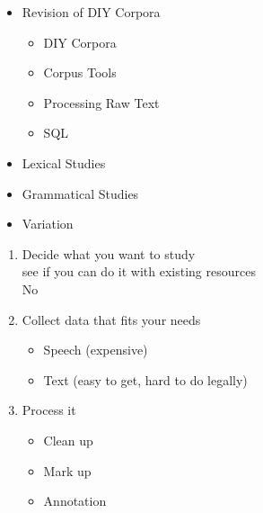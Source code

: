 \documentclass[a4paper,landscape,headrule,footrule,dvips]{foils}
\begin{document}
\begin{CJK}{UTF8}{min}

\maketitle



\begin{itemize} 
\item Revision  of DIY Corpora
  \begin{itemize} 
  \item DIY Corpora
  \item Corpus Tools
  \item Processing Raw Text
  \item SQL
  \end{itemize}
\item Lexical Studies
\item Grammatical Studies
\item Variation
\end{itemize}





\begin{enumerate}
\item Decide what you want to study
\\ see if you can do it with existing resources
\\ No \frownie
\item Collect data that fits your needs
  \begin{itemize}
  \item Speech (expensive)
  \item Text (easy to get, hard to do legally)
  \end{itemize}
\item Process it
  \begin{itemize}
  \item Clean up
  \item Mark up
  \item Annotation
  \end{itemize}
\end{enumerate}


\end{CJK}
\end{document}
